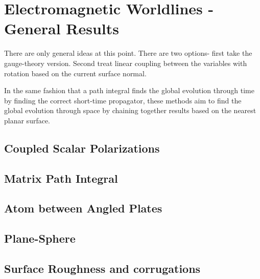 \chapter{Electromagnetic Worldlines - General Results}
\label{ch:general}
There are only general ideas at this point.
There are two options- first take the gauge-theory version.
Second treat linear coupling between the variables with rotation based on the current surface normal.

In the same fashion that a path integral finds the global evolution through time by finding the correct short-time
propagator, these methods aim to find the global evolution through space by chaining together
results based on the nearest planar surface.  

\section{Coupled Scalar Polarizations}

\section{Matrix Path Integral}

    \section{Atom between Angled Plates}
    \section{Plane-Sphere}
    \section{Surface Roughness and corrugations}

